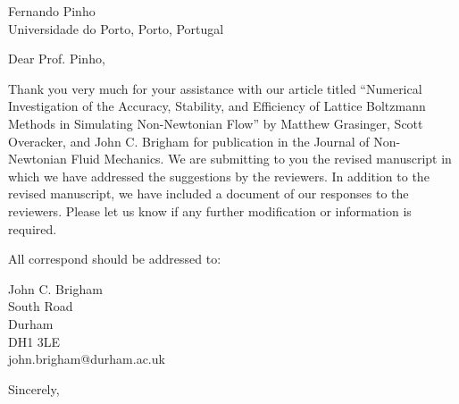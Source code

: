 \documentclass{letter}
\begin{document}
	\begin{letter}{Fernando Pinho \\ Universidade do Porto, Porto, Portugal}
		\opening{Dear Prof. Pinho,}
		Thank you very much for your assistance with our article titled ``Numerical Investigation of the Accuracy, Stability, and Efficiency of Lattice Boltzmann Methods in Simulating Non-Newtonian Flow'' by Matthew Grasinger, Scott Overacker, and John C. Brigham for publication in the Journal of Non-Newtonian Fluid Mechanics. We are submitting to you the revised manuscript in which we have addressed the suggestions by the reviewers. In addition to the revised manuscript, we have included a document of our responses to the reviewers. Please let us know if any further modification or information is required.
		
		All correspond should be addressed to:
		
		John C. Brigham\\
		South Road\\
		Durham\\
		DH1 3LE\\
		john.brigham@durham.ac.uk
		
		\vspace{1in}
		\closing{Sincerely,}
	\end{letter}
\end{document}
